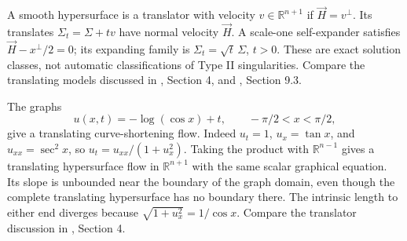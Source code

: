 \begin{definition}\label{def:mcf-other-solitons}
A smooth hypersurface is a translator with velocity $v\in\mathbb R^{n+1}$ if $\vec H=v^\perp$. Its translates $\Sigma_t=\Sigma+tv$ have normal velocity $\vec H$. A scale-one self-expander satisfies $\vec H-x^\perp/2=0$; its expanding family is $\Sigma_t=\sqrt t\,\Sigma$, $t>0$. These are exact solution classes, not automatic classifications of Type II singularities. Compare the translating models discussed in \cite{HP99}, Section 4, and \cite{WhiMCF15}, Section 9.3.
\end{definition}

\begin{example}\label{ex:mcf-grim-reaper}
The graphs
\[
 u(x,t)=-\log(\cos x)+t,\qquad -\pi/2<x<\pi/2,
\]
give a translating curve-shortening flow. Indeed $u_t=1$, $u_x=\tan x$, and $u_{xx}=\sec^2x$, so $u_t=u_{xx}/(1+u_x^2)$. Taking the product with $\mathbb R^{n-1}$ gives a translating hypersurface flow in $\mathbb R^{n+1}$ with the same scalar graphical equation. Its slope is unbounded near the boundary of the graph domain, even though the complete translating hypersurface has no boundary there. The intrinsic length to either end diverges because $\sqrt{1+u_x^2}=1/\cos x$. Compare the translator discussion in \cite{HP99}, Section 4.
\end{example}
